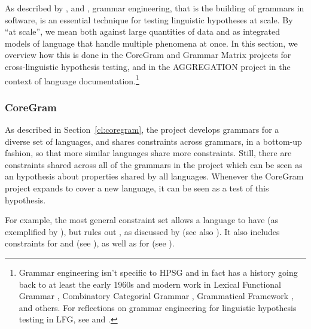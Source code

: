 \documentclass[output=paper,nonflat]{langsci/langscibook}
\begin{document}
As described by \citet{Mueller99a}, \citet{Bender2008c} and \citet{BFO2011a-u},
grammar engineering, that is the building of grammars in software, is
an essential technique for testing linguistic hypotheses at scale. By
``at scale'', we mean both against large quantities of data and as
integrated models of language that handle multiple phenomena at
once. In this section, we overview how this is done in the CoreGram
and Grammar Matrix projects for cross-linguistic hypothesis testing,
and in the AGGREGATION project in the context of language
documentation.\footnote{Grammar engineering isn't specific to HPSG and
in fact has a history going back to at least the early 1960s \citep{Kay:63,ZFHW65a,Petrick65a-u,FBDPM71a-u}
and modern work in Lexical Functional Grammar \citep{BKNS99a-ed}, Combinatory Categorial
Grammar \citep{BCPW2007a}, Grammatical Framework \citep{Ranta:09}, and others.
For reflections on grammar engineering for linguistic hypothesis testing
in LFG, see \citealt{BKNS99a-ed} and \citealt{King:16}.}



\subsubsection{CoreGram}
\label{cl:lang-doc:coregram}

As described in Section~\ref{cl:coregram},
the  project develops grammars for a diverse set of languages,
and shares constraints across grammars, in a bottom-up fashion, so that more
similar languages share more constraints. Still, there are constraints
shared across all of the grammars in the project which can be seen
as an hypothesis about properties shared by all languages.
Whenever the CoreGram project expands to cover a new language,
it can be seen as a test of this hypothesis.

For example, the most general constraint set
allows a language to have 
(as exemplified by ),
but rules out ,
as discussed by \citet{MuellerCoreGram}
(see also ).
It also includes constraints for  and 
(see ),
as well as for 
(see ).
\end{document}
